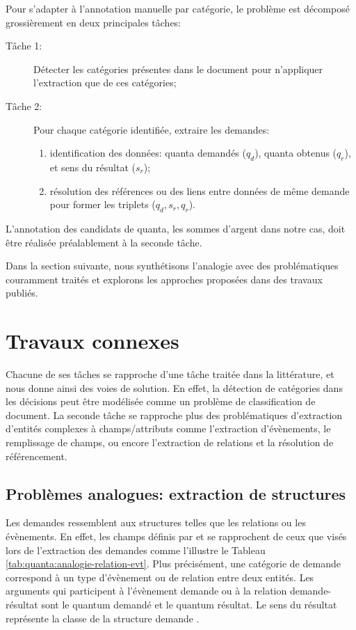 Pour s'adapter à l'annotation manuelle par catégorie, le problème est décomposé grossièrement en deux principales tâches:
\begin{description}
\item[Tâche 1:] Détecter les catégories présentes dans le document pour n'appliquer l'extraction  que de ces catégories;
\item[Tâche 2:] Pour chaque catégorie identifiée, extraire les demandes:
\begin{enumerate}
	\item identification des données: quanta demandés ($q_d$), quanta obtenus ($q_r$), et sens du résultat ($s_r$);
	\item résolution des références ou des liens entre données de même demande pour former les triplets ($q_d, s_r, q_r$).
\end{enumerate}
\end{description}

L'annotation des candidats de quanta, les sommes d'argent dans notre cas, doit être réalisée préalablement à la seconde tâche.

 Dans la section suivante, nous synthétisons l'analogie avec des problématiques couramment traités et explorons les approches proposées dans des travaux publiés.

\section{Travaux connexes}
\label{sec:quanta:biblio}
Chacune de ses tâches se rapproche d'une tâche traitée dans la littérature, et nous donne ainsi des voies de solution. En effet, la détection de catégories dans les décisions peut être modélisée comme un problème de classification de document. La seconde tâche se rapproche plus des problématiques d'extraction d'entités complexes à champs/attributs comme l'extraction d'évènements, le remplissage de champs, ou encore l'extraction de relations et la résolution de référencement.

\subsection{Problèmes analogues: extraction de structures}%

Les demandes ressemblent aux structures telles que les relations ou les évènements. En effet, les champs définis par \citet{ace2005relation} et \citet{ace2005event} se rapprochent de ceux que visés lors de l'extraction des demandes comme l'illustre le Tableau \ref{tab:quanta:analogie-relation-evt}. Plus précisément, une catégorie de demande correspond à un type d'évènement ou de relation entre deux entités. Les arguments qui participent à l'évènement \og demande \fg{} ou à la relation \og demande-résultat \fg{} sont le quantum demandé et le quantum résultat. Le sens du résultat représente la classe de la structure \og demande \fg{}.

